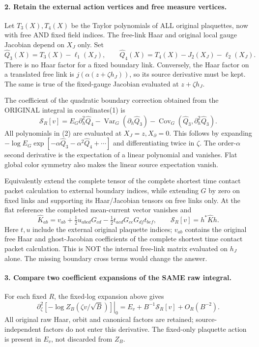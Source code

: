 \documentclass[11pt]{article}
\begin{document}
\paragraph{2. Retain the external action vertices and free measure vertices.}
Let $T_3(X),T_4(X)$ be the Taylor polynomials of ALL original plaquettes,
now with free AND fixed field indices. The free-link Haar and original
local gauge Jacobian depend on $X_J$ only. Set
\[
 \widehat Q_3(X)=T_3(X)-\ell_1(X_J),\qquad
 \widehat Q_4(X)=T_4(X)-J_2(X_J)-\ell_2(X_J).
\]
There is no Haar factor for a fixed boundary link. Conversely, the Haar
factor on a translated free link is $j(\alpha(z+\zeta h_J))$, so its
source derivative must be kept. The same is true of the fixed-gauge
Jacobian evaluated at $z+\zeta h_J$.

The coefficient of the quadratic boundary correction obtained from the
ORIGINAL integral in coordinates(1) is
\[
 \boxed{\mathcal S_R[v]=
 E_G\partial_h^2\widehat Q_4
 -\operatorname{Var}_G(\partial_h\widehat Q_3)
 -\operatorname{Cov}_G(\widehat Q_3,
                                      \partial_h^2\widehat Q_3).} \tag{2}
\]
All polynomials in (2) are evaluated at $X_J=z,X_\partial=0$.
This follows by expanding
$-\log E_G\exp[-\alpha\widehat Q_3-\alpha^2\widehat Q_4+\cdots]$
and differentiating twice in $\zeta$. The order-$\alpha$ second derivative
is the expectation of a linear polynomial and vanishes. Flat global color
symmetry also makes the linear source expectation vanish.

Equivalently extend the complete tensor of the complete shortest time contact packet calculation to external boundary
indices, while extending $G$ by zero on fixed links and supporting its
Haar/Jacobian tensors on free links only. At the flat reference the
completed mean-current vector vanishes and
\[
 \widehat K_{ab}=v_{ab}+\tfrac12u_{abcd}G_{cd}
                  -\tfrac12t_{acd}G_{ce}G_{df}t_{bef},\qquad
 \mathcal S_R[v]=h^*\widehat K h.                                 \tag{3}
\]
Here $t,u$ include the external original plaquette indices; $v_{ab}$
contains the original free Haar and ghost-Jacobian coefficients of the complete shortest time contact packet calculation.
This is NOT the internal free-link matrix evaluated on $h_J$ alone.
The missing boundary cross terms would change the answer.

\paragraph{3. Compare two coefficient expansions of the SAME raw integral.}
For each fixed $R$, the fixed-log expansion above gives
\[
 \left.\partial_\zeta^2[-\log Z_B(\zeta v/\sqrt B)]\right|_0
       =E_v+B^{-1}\mathcal S_R[v]+O_R(B^{-2}).                    \tag{4}
\]
All original raw Haar, orbit and canonical factors are retained;
source-independent factors do not enter this derivative. The fixed-only
plaquette action is present in $E_v$, not discarded from $Z_B$.
\end{document}
